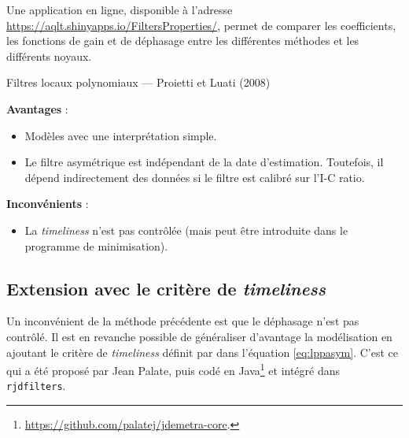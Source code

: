 \documentclass[
  12pt,
  french,
  12pt,a4paper]{article}
\providecommand{\tightlist}{%
  \setlength{\itemsep}{0pt}\setlength{\parskip}{0pt}}
\newcommand\1{\mathds{1}}
\begin{document}
Une application en ligne, disponible à l'adresse \url{https://aqlt.shinyapps.io/FiltersProperties/}, permet de comparer les coefficients, les fonctions de gain et de déphasage entre les différentes méthodes et les différents noyaux.

\begin{summary_box}{Filtres locaux polynomiaux --- Proietti et Luati (2008)}

\textbf{Avantages} :

\begin{itemize}
\item
  Modèles avec une interprétation simple.
\item
  Le filtre asymétrique est indépendant de la date d'estimation.
  Toutefois, il dépend indirectement des données si le filtre est calibré sur l'I-C ratio.
\end{itemize}

\textbf{Inconvénients} :

\begin{itemize}
\tightlist
\item
  La \emph{timeliness} n'est pas contrôlée (mais peut être introduite dans le programme de minimisation).
\end{itemize}

\end{summary_box}

\hypertarget{subsec-lptimeliness}{%
\subsection{\texorpdfstring{Extension avec le critère de \emph{timeliness}}{Extension avec le critère de timeliness}}\label{subsec-lptimeliness}}

Un inconvénient de la méthode précédente est que le déphasage n'est pas contrôlé.
Il est en revanche possible de généraliser d'avantage la modélisation en ajoutant le critère de \emph{timeliness} définit par \textcite{ch15HBSA} dans l'équation \eqref{eq:lppasym}.
C'est ce qui a été proposé par Jean Palate, puis codé en Java\footnote{\url{https://github.com/palatej/jdemetra-core}.} et intégré dans \texttt{rjdfilters}.
\end{document}
